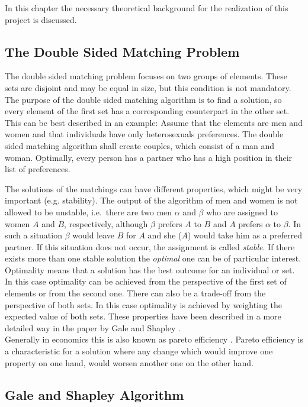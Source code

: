 \label{theory}
In this chapter the necessary theoretical background for the realization of this project is discussed.

\subsection{The Double Sided Matching Problem}
The double sided matching problem focuses on two groups of elements.
These sets are disjoint and may be equal in size, but this condition is not mandatory.
The purpose of the double sided matching algorithm is to find a solution, so every element of the first set has a corresponding counterpart in the other set. 
This can be best described in an example:
Assume that the elements are men and women and that individuals have only heterosexuals preferences.
The double sided matching algorithm shall create couples, which consist of a man and woman.
Optimally, every person has a partner who has a high position in their list of preferences.

The solutions of the matchings can have different properties, which might be very important (e.g. stability).
The output of the algorithm of men and women is not allowed to be unstable, i.e.\ there are two men $\alpha$ and $\beta$ who are assigned to women $A$ and $B$, respectively, although $\beta$ prefers $A$ to $B$ and $A$ prefers $\alpha$ to $\beta$.
In such a situation $\beta$ would leave $B$ for $A$ and she ($A$) would take him as a preferred partner.
If this situation does not occur, the assignment is called \textit{stable}.
If there exists more than one stable solution the \textit{optimal} one can be of particular interest.\\ 
Optimality means that a solution has the best outcome for an individual or set.
In this case optimality can be achieved from the perspective of the first set of elements or from the second one.
There can also be a trade-off from the perspective of both sets. 
In this case optimality is achieved by weighting the expected value of both sets.
These properties have been described in a more detailed way in the paper by Gale and Shapley \cite{gale62a}.\\
Generally in economics this is also known as pareto efficiency \cite[p. 46]{9780199297818}. 
Pareto efficiency is a characteristic for a solution where any change which would improve one property on one hand, would worsen another one on the other hand.


\subsection{Gale and Shapley Algorithm}

